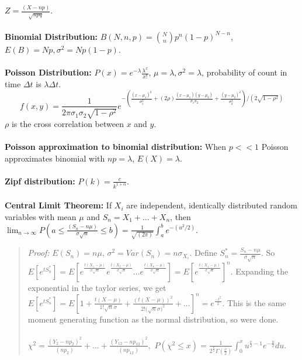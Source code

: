 $Z={\frac {(X-np)} {\sqrt {npq}}}$.
\\
\\
{\bf Binomial Distribution:} $B(N, n, p) = {N \choose n} p^{n}(1-p)^{N-n}$,
$E(B)=Np, \sigma^2= Np(1-p)$.
\\
\\
{\bf Poisson Distribution:} $P(x)= e^{- \lambda} {\frac {\lambda^{x}} {x!}}$, 
$\mu= \lambda, \sigma^2= \lambda$, probability of count in time $\Delta t$ is
$\lambda \Delta t$.  
$$f(x,y)= {\frac 1 {2 \pi \sigma_1 \sigma_2 {\sqrt {1- \rho^2}}}}
e^{- ({\frac {(x-\mu_1)^2} {\sigma_1^2}} +
(2 \rho){\frac {(x-\mu_1)(y- \mu_2)} {\sigma_1 \sigma_2}} +
{\frac {(y-\mu_2)^2} {\sigma_2^2}})/(2 {\sqrt {1-\rho^2}})}$$ 
$\rho$ is the cross correlation between $x$ and $y$.
\\
\\
{\bf Poisson approximation to binomial distribution:}  
When $p<<1$ Poisson approximates binomial with
$np= \lambda$, $E(X)= \lambda$.
\\
\\
{\bf Zipf distribution:}  $P(k)= {\frac c {k^{1+\alpha}}}$.
\\
\\
{\bf Central Limit Theorem:}  If $X_i$ are independent, identically distributed
random variables with mean $\mu$ and
$S_{n}= X_{1}+ \ldots + X_{n}$, then $\lim_{n \rightarrow \infty}
P(a \leq  {\frac {(S_{n}-n \mu)} {\sigma {\sqrt n}}} \leq b) =
{\frac {1} {\sqrt {(2 \pi)}}} \int_{a}^{b} e^{-(u^{2}/2)}$.
\begin{quote}
\emph{Proof:} $E(S_n)= n \mu$, $\sigma^2=Var(S_n)= n\sigma_{X_i}$.  Define
$S^*_n= {\frac {S_n -n\mu} {\sigma {\sqrt n}}}$.  So
$E[e^{tS^*_n}]=E[
e^{\frac {t(X_1-\mu)} {\sigma {\sqrt n}}}
e^{\frac {t(X_2-\mu)} {\sigma {\sqrt n}}} \ldots
e^{\frac {t(X_n-\mu)} {\sigma {\sqrt n}}}]=
E[e^{\frac {t(X_1-\mu)} {\sigma {\sqrt n}}}]^n$.
Expanding the exponential in the taylor series, we get
$E[e^{tS^*_n}]=E[1+
{\frac {t(X-\mu)} {1! {\sqrt n} \sigma}}+
{\frac {(t(X-\mu))^2} {2! {({\sqrt n} \sigma})^2}}+
\ldots]^n = e^{\frac {-t^2} 2}$.  This is the same moment generating function
as the normal distribution, so were done.  \\
\\
$\chi^{2}= {\frac {(Y_{2}- n p_{2})^{2}} {( n p_{2})}} +...+
{\frac {(Y_{12}- n p_{12})^{2}} {(n p_{12})}},$
$P(\chi^{2} \leq x)= {\frac {1} {2^{\frac {\nu} {2}} \Gamma({\frac {\nu}
{2}})}} \int_{0}^{x} u^{{\frac {\nu} {2}}-1} e^{-{\frac {u} {2}}} du$.
\end{quote}
